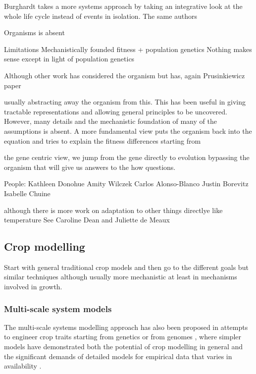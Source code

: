 \documentclass[phd]{infthesis}
\begin{document}
Burghardt takes a more systems approach by taking an integrative look at the
whole life cycle instead of events in isolation. The same authors

Organisms is absent

Limitations
Mechanistically founded fitness + population genetics
Nothing makes sense except in light of population genetics

Although other work has considered the organism but has, again
Prusinkiewicz paper


usually abstracting away the organism from this.
This has been useful in giving tractable representations and allowing general
principles to be uncovered. However, many details and the mechanistic foundation
of many of the assumptions is absent. A more fundamental view puts the organism
back into the equation and tries to explain the fitness differences starting
from

the gene centric view, we jump from the gene directly to evolution bypassing the
organism that will give us answers to the how questions.

People:
Kathleen Donohue
Amity Wilczek
Carlos Alonso-Blanco
Justin Borevitz
Isabelle Chuine

although there is more work on adaptation to other things directlye like
temperature
See Caroline Dean and Juliette de Meaux



\subsection{Crop modelling}
Start with general traditional crop models and then go to the
different goals but similar techniques although usually more mechanistic at
least in mechanisms involved in growth.


\subsubsection*{Multi-scale system models}
The multi-scale systems modelling approach has also been proposed in attempts to
engineer crop traits starting from genetics or from genomes
\citep{welch_merging_2005, yin_applying_nodate, yin_modelling_2010,
  parent_can_2014, wu_connecting_2016, chenu_integrating_2018}, where simpler
models have demonstrated both the potential of crop modelling in general and the
significant demands of detailed models for empirical data that varies in
availability \citep{hammer_models_2006,asseng_uncertainty_2013}.
\end{document}

